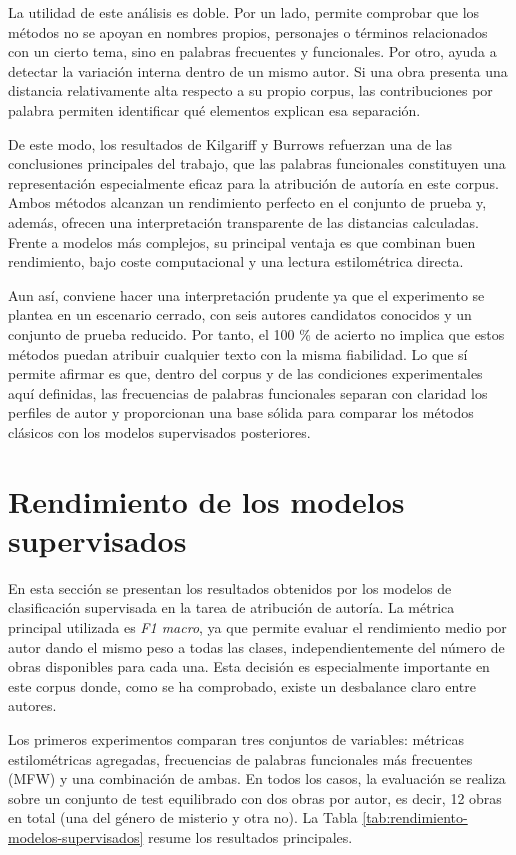 \documentclass[IB]{TFUOC}%
\begin{document}
La utilidad de este análisis es doble. Por un lado, permite comprobar que los métodos no se apoyan en nombres propios, personajes o términos relacionados con un cierto tema, sino en palabras frecuentes y funcionales. Por otro, ayuda a detectar la variación interna dentro de un mismo autor. Si una obra presenta una distancia relativamente alta respecto a su propio corpus, las contribuciones por palabra permiten identificar qué elementos explican esa separación.

De este modo, los resultados de Kilgariff y Burrows refuerzan una de las conclusiones principales del trabajo, que las palabras funcionales constituyen una representación especialmente eficaz para la atribución de autoría en este corpus. Ambos métodos alcanzan un rendimiento perfecto en el conjunto de prueba y, además, ofrecen una interpretación transparente de las distancias calculadas. Frente a modelos más complejos, su principal ventaja es que combinan buen rendimiento, bajo coste computacional y una lectura estilométrica directa.

Aun así, conviene hacer una interpretación prudente ya que el experimento se plantea en un escenario cerrado, con seis autores candidatos conocidos y un conjunto de prueba reducido. Por tanto, el 100 \% de acierto no implica que estos métodos puedan atribuir cualquier texto con la misma fiabilidad. Lo que sí permite afirmar es que, dentro del corpus y de las condiciones experimentales aquí definidas, las frecuencias de palabras funcionales separan con claridad los perfiles de autor y proporcionan una base sólida para comparar los métodos clásicos con los modelos supervisados posteriores.

\section{Rendimiento de los modelos supervisados}

En esta sección se presentan los resultados obtenidos por los modelos de clasificación supervisada en la tarea de atribución de autoría. La métrica principal utilizada es \textit{F1 macro}, ya que permite evaluar el rendimiento medio por autor dando el mismo peso a todas las clases, independientemente del número de obras disponibles para cada una. Esta decisión es especialmente importante en este corpus donde, como se ha comprobado, existe un desbalance claro entre autores.

Los primeros experimentos comparan tres conjuntos de variables: métricas estilométricas agregadas, frecuencias de palabras funcionales más frecuentes (MFW) y una combinación de ambas. En todos los casos, la evaluación se realiza sobre un conjunto de test equilibrado con dos obras por autor, es decir, 12 obras en total (una del género de misterio y otra no). La Tabla \ref{tab:rendimiento-modelos-supervisados} resume los resultados principales.
\end{document}
